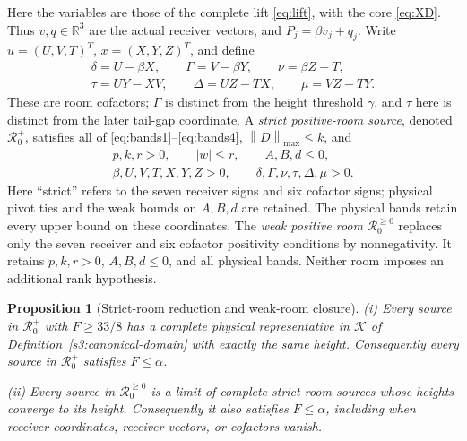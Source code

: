 \documentclass[11pt,reqno]{amsart}
\newtheorem{proposition}[theorem]{Proposition}
\theoremstyle{definition}
\theoremstyle{remark}
\newcommand{\R}{\mathbb R}
\newcommand{\mx}[1]{\left\|#1\right\|_{\max}}
\newcommand{\gam}{\gamma}
\begin{document}
Here the variables are those of the complete lift \eqref{eq:lift},
with the core \eqref{eq:XD}.  Thus \(v,q\in\R^3\) are the actual
receiver vectors, and \(P_j=\beta v_j+q_j\).  Write
\(u=(U,V,T)^T\), \(x=(X,Y,Z)^T\), and define
\begin{equation}\label{x:room-cofactors}
\begin{gathered}
\delta=U-\beta X,\qquad \Gamma=V-\beta Y,\qquad
\nu=\beta Z-T,\\
\tau=UY-XV,\qquad \Delta=UZ-TX,\qquad \mu=VZ-TY.
\end{gathered}
\end{equation}
These are room cofactors; \(\Gamma\) is distinct from the height
threshold \(\gam\), and \(\tau\) here is distinct from the later
tail-gap coordinate.  A \emph{strict positive-room source}, denoted
\(\mathcal R_0^+\), satisfies all of
\eqref{eq:bands1}--\eqref{eq:bands4}, \(\mx D\le k\), and
\begin{equation}\label{x:strict-room}
\begin{gathered}
p,k,r>0,\qquad |w|\le r,\qquad A,B,d\le0,\\
\beta,U,V,T,X,Y,Z>0,\qquad
\delta,\Gamma,\nu,\tau,\Delta,\mu>0.
\end{gathered}
\end{equation}
Here ``strict'' refers to the seven receiver signs and six cofactor
signs; physical pivot ties and the weak bounds on \(A,B,d\) are retained.
The physical bands retain every upper bound on these coordinates.
The \emph{weak positive room} \(\mathcal R_0^{\ge0}\) replaces only
the seven receiver and six cofactor positivity conditions by
nonnegativity.  It retains \(p,k,r>0\), \(A,B,d\le0\), and all
physical bands.  Neither room imposes an additional rank hypothesis.

\begin{proposition}[Strict-room reduction and weak-room closure]
\label{x:room-proposition}
\textup{(i)} Every source in \(\mathcal R_0^+\) with
\(F\ge33/8\) has a complete physical representative in
\(\mathcal K\) of Definition~\ref{s3:canonical-domain} with exactly
the same height.  Consequently every source in \(\mathcal R_0^+\)
satisfies \(F\le\alpha\).

\smallskip
\textup{(ii)} Every source in \(\mathcal R_0^{\ge0}\) is a limit
of complete strict-room sources whose heights converge to its height.
Consequently it also satisfies \(F\le\alpha\), including when
receiver coordinates, receiver vectors, or cofactors vanish.
\end{proposition}
\end{document}
